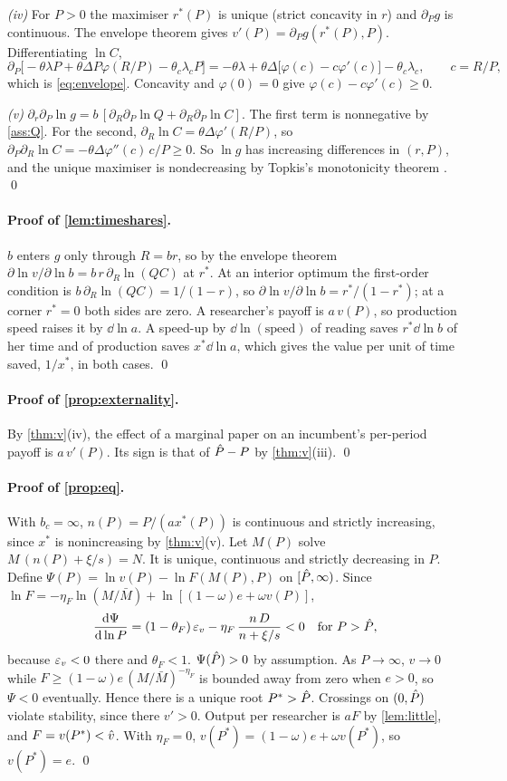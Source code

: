 \emph{(iv)} For $P>0$ the maximiser $r^*(P)$ is unique (strict concavity in $r$) and $\partial_P g$ is continuous. The envelope theorem \citep{milgromsegal2002} gives $v'(P)=\partial_Pg(r^*(P),P)$. Differentiating $\ln C$,
\[
\partial_P\big[-\theta\lambda P+\theta\Delta P\varphi(R/P)-\theta_c\lambda_cP\big]=-\theta\lambda+\theta\Delta\big[\varphi(c)-c\varphi'(c)\big]-\theta_c\lambda_c,\qquad c=R/P,
\]
which is \eqref{eq:envelope}. Concavity and $\varphi(0)=0$ give $\varphi(c)-c\varphi'(c)\ge0$.

\emph{(v)} $\partial_r\partial_P\ln g=b\,[\partial_R\partial_P\ln Q+\partial_R\partial_P\ln C]$. The first term is nonnegative by \cref{ass:Q}. For the second,
$\partial_R\ln C=\theta\Delta\varphi'(R/P)$, so $\partial_P\partial_R\ln C=-\theta\Delta\varphi''(c)\,c/P\ge0$. So $\ln g$ has increasing differences in $(r,P)$, and the unique maximiser is nondecreasing by Topkis's monotonicity theorem \citep{topkis1998}. \qed

\paragraph{Proof of \cref{lem:timeshares}.} $b$ enters $g$ only through
$R=br$, so by the envelope theorem
$\partial\ln v/\partial\ln b=b\,r\,\partial_R\ln(QC)$ at $r^*$. At an interior
optimum the first-order condition is $b\,\partial_R\ln(QC)=1/(1-r)$, so
$\partial\ln v/\partial\ln b=r^*/(1-r^*)$; at a corner $r^*=0$ both sides are
zero. A researcher's payoff is $a\,v(P)$, so production speed raises it by
$\dd\ln a$. A speed-up by $\dd\ln(\text{speed})$ of reading saves
$r^*\dd\ln b$ of her time and of production saves $x^*\dd\ln a$, which gives
the value per unit of time saved, $1/x^*$, in both cases. \qed

\paragraph{Proof of \cref{prop:externality}.} By \cref{thm:v}(iv), the effect
of a marginal paper on an incumbent's per-period payoff is $a\,v'(P)$. Its sign is
that of $\hat P-P$ by \cref{thm:v}(iii). \qed

\paragraph{Proof of \cref{prop:eq}.} With $b_c=\infty$, $n(P)=P/(a x^*(P))$ is
continuous and strictly increasing, since $x^*$ is nonincreasing by
\cref{thm:v}(v). Let $M(P)$ solve $M\,(n(P)+\xi/s)=N$. It is unique, continuous
and strictly decreasing in $P$. Define $\Psi(P)=\ln v(P)-\ln F(M(P),P)$ on
$[\hat P,\infty)$. Since $\ln F=-\eta_F\ln(M/\bar M)+\ln[(1-\omega)e+\omega v(P)]$,
\[
\frac{\mathrm{d}\Psi}{\mathrm{d}\ln P}=(1-\theta_F)\,\varepsilon_v-\eta_F\,\frac{n\,D}{n+\xi/s}<0\quad\text{for }P>\hat P,
\]
because $\varepsilon_v<0$ there and $\theta_F<1$. $\Psi(\hat P)>0$ by assumption. As
$P\to\infty$, $v\to0$ while $F\ge(1-\omega)e\,(M/\bar M)^{-\eta_F}$ is bounded
away from zero when $e>0$, so $\Psi<0$ eventually. Hence there is a unique root
$P^*>\hat P$. Crossings on $(0,\hat P)$ violate stability, since there $v'>0$.
Output per researcher is $aF$ by \cref{lem:little}, and $F=v(P^*)<\hat v$. With
$\eta_F=0$, $v(P^*)=(1-\omega)e+\omega v(P^*)$, so $v(P^*)=e$. \qed


